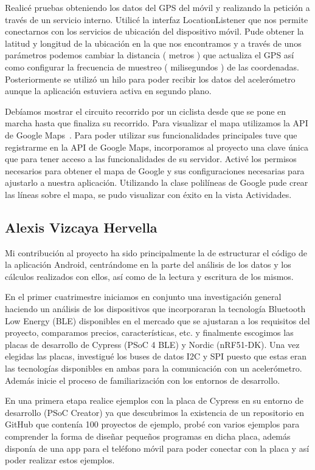 Realicé pruebas obteniendo los datos del GPS del móvil y realizando la petición a través de un servicio interno. Utilicé la interfaz LocationListener que nos permite conectarnos con los servicios de ubicación del dispositivo móvil. Pude obtener la latitud y longitud de la ubicación en la que nos encontramos y a través de unos parámetros podemos cambiar la distancia ( metros ) que actualiza el GPS así como configurar la frecuencia de muestreo ( milisegundos ) de las coordenadas. Posteriormente se utilizó un hilo para poder recibir los datos del acelerómetro aunque la aplicación estuviera activa en segundo plano.

Debíamos mostrar el circuito recorrido por un ciclista desde que se pone en marcha hasta que finaliza su recorrido. Para visualizar el mapa utilizamos la API de Google Maps~\cite{APIGoogleMaps}. Para poder utilizar sus funcionalidades principales tuve que registrarme en la API de Google Maps, incorporamos al proyecto una clave única que para tener acceso a las funcionalidades de su servidor. Activé los permisos necesarios para obtener el mapa de Google y sus configuraciones necesarias para ajustarlo a nuestra aplicación. Utilizando la clase polilíneas de Google pude crear las líneas sobre el mapa, se pudo visualizar con éxito en la vista Actividades.

\subsection{Alexis Vizcaya Hervella}

Mi contribución al proyecto ha sido principalmente la de estructurar el código de la aplicación Android, centrándome en la parte del análisis de los datos y los cálculos realizados con ellos, así como de la lectura y escritura de los mismos.  

En el primer cuatrimestre iniciamos en conjunto una investigación general haciendo un análisis de los dispositivos que incorporaran la tecnología Bluetooth Low Energy (BLE) disponibles en el mercado que se ajustaran a los requisitos del proyecto, comparamos precios, características, etc. y finalmente escogimos las placas de desarrollo de Cypress (PSoC 4 BLE) y Nordic (nRF51-DK). Una vez elegidas las placas, investigué los buses de datos I2C y SPI puesto que estas eran las tecnologías disponibles en ambas para la comunicación con un acelerómetro. Además inicie el proceso de familiarización con los entornos de desarrollo.

En una primera etapa realice ejemplos con la placa de Cypress en su entorno de desarrollo (PSoC Creator) ya que descubrimos la existencia de un repositorio en GitHub que contenía 100 proyectos de ejemplo, probé con varios ejemplos para comprender la forma de diseñar pequeños programas en dicha placa, además disponía de una app para el teléfono móvil para poder conectar con la placa y así poder realizar estos ejemplos. 

